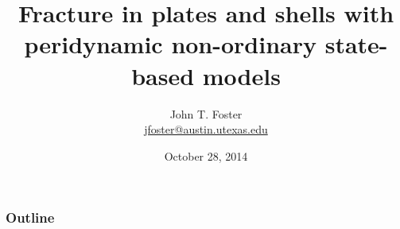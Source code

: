 \documentclass[t,serif]{beamer}
\title{Fracture in plates and shells with peridynamic non-ordinary state-based models}
\author{John T. Foster \\ \href{mailto:jfoster@austin.utexas.edu}{jfoster@austin.utexas.edu}}
\institute{The University of Texas at Austin}
\date{October 28, 2014}
\begin{document}
\begin{frame}
\titlepage
\note{ }
\end{frame}

\begin{frame}
\frametitle{Outline}
\tableofcontents[hideallsubsections]
\note{ }
\end{frame}


\end{document}
